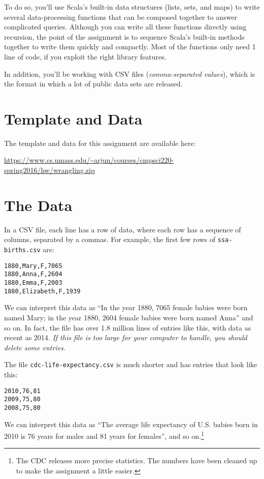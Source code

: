\documentclass{book}
\begin{document}
To do so, you'll use Scala's built-in data
structures (lists, sets, and maps) to write several data-processing functions
that can be composed together to answer complicated queries.
Although you can write all these functions directly using recursion,
the point of the assignment is to sequence Scala's built-in methods together
to write them quickly and compactly. Most of the functions only need
1 line of code, if you exploit the right library features.

In addition, you'll be working with CSV files (\emph{comma-separated values}),
which is the format in which a lot of public data sets are released.

\section{Template and Data}

The template and data for this assignment are available here:

\url{https://www.cs.umass.edu/~arjun/courses/cmpsci220-spring2016/hw/wrangling.zip}

\section{The Data}

In a CSV file, each line has a row of data, where each row
has a sequence of columns, separated by a commas. For example, the
first few rows of \texttt{ssa-births.csv} are:

\begin{verbatim}
1880,Mary,F,7065
1880,Anna,F,2604
1880,Emma,F,2003
1880,Elizabeth,F,1939
\end{verbatim}

We can interpret this data as ``In the year 1880, 7065 female babies were born
named Mary; in the year 1880, 2604 female babies were born named Anna'' and so on.
In fact, the file has over 1.8 million lines of entries like this, with data
as recent as 2014. \emph{If this file is too large for your computer to handle,
you should delete some entries}.

The file \texttt{cdc-life-expectancy.csv} is much shorter and has entries
that look like this:

\begin{verbatim}
2010,76,81
2009,75,80
2008,75,80
\end{verbatim}

We can interpret this data as ``The average life expectancy of U.S. babies born
in 2010 is 76 years for males and 81 years for females'', and so
on.\footnote{The CDC releases more precise statistics. The numbers have been
cleaned up to make the assignment a little easier.}
\end{document}
